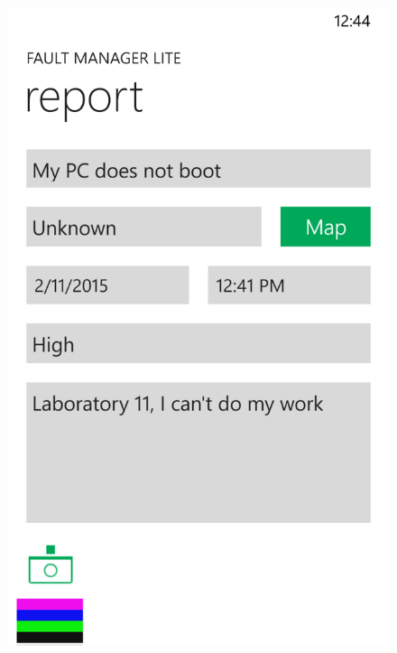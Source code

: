 \documentclass{report}
\begin{document}
\begin{figure}[hbtp]
\begin{minipage}{0.3\textwidth}
\end{minipage}
\hspace{0.02\textwidth}
\begin{minipage}{0.3\textwidth}
\includegraphics[width=\textwidth]{img/ReportPage.png}
\end{minipage}
\hspace{0.02\textwidth}
\begin{minipage}{0.3\textwidth}

\end{minipage}
\end{figure}
\end{document}
